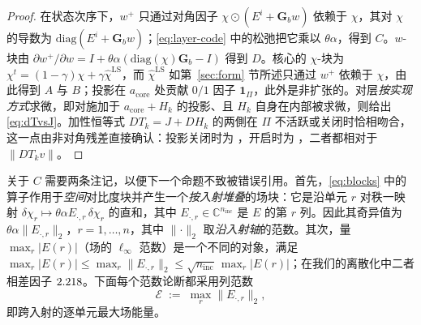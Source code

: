 \documentclass[UTF8,a4paper,11pt]{ctexart}
\newcommand{\C}{\mathbb{C}}
\newcommand{\norm}[1]{\lVert #1 \rVert}
\newcommand{\numv}[1]{#1}
\begin{document}
\begin{proof}
在状态次序下，$w^{+}$ 只通过对角因子
$\chi\odot(E^i+\mathbf{G}_b w)$ 依赖于 $\chi$，其对 $\chi$ 的导数为
$\mathrm{diag}(E^i+\mathbf{G}_b w)$；\eqref{eq:layer-code} 中的松弛把它乘以
$\theta\alpha$，得到 $C$。$w$-块由
$\partial w^{+}/\partial w=I+\theta\alpha(\mathrm{diag}(\chi)\mathbf{G}_b-I)$ 得到 $D$。核心的 $\chi$-块为 $\chi^{t}=(1-\gamma)\chi+\gamma\hat\chi^{\mathrm{LS}}$，而
$\hat\chi^{\mathrm{LS}}$ 如第~\ref{sec:form} 节所述只通过 $w^{+}$ 依赖于 $\chi$，由此得到
$A$ 与 $B$；投影在 $a_{\mathrm{core}}$ 处贡献 $0/1$ 因子 $\mathbf{1}_{\Pi}$，此外是非扩张的。对层\emph{按实现方式}求微，即对施加于 $a_{\mathrm{core}}+H_k$ 的投影、且 $H_k$ 自身在内部被求微，则给出 \eqref{eq:dTvsJ}。加性恒等式 $DT_k=J+DH_k$ 的两側在 $\Pi$ 不活跃或关闭时恰相吻合，这一点由非对角残差直接确认：投影关闭时为 \numv{\NumTOneRelOff}，开启时为 \numv{\NumTOneRelOn}，二者都相对于 $\norm{DT_kv}$。
\end{proof}
关于 $C$ 需要两条注记，以便下一个命题不致被错误引用。首先，\eqref{eq:blocks} 中的算子作用于\emph{空间}对比度块并产生一个\emph{按入射堆叠}的场块：它是沿单元 $r$ 对秩一映射 $\delta\chi_r\mapsto\theta\alpha E_{\cdot,r}\,\delta\chi_r$ 的直和，其中 $E_{\cdot,r}\in\C^{n_{\mathrm{inc}}}$ 是 $E$ 的第 $r$ 列。因此其奇异值为
$\theta\alpha\norm{E_{\cdot,r}}_2$，$r=1,\dots,n$，其中 $\norm{\cdot}_2$ 取\emph{沿入射轴}的范数。其次，量 $\max_r|E(r)|$（场的 $\ell_\infty$ 范数）是一个不同的对象，满足
$\max_r|E(r)|\le\max_r\norm{E_{\cdot,r}}_2\le\sqrt{n_{\mathrm{inc}}}\,\max_r|E(r)|$；在我们的离散化中二者相差因子 $\numv{\NumEInfRatio}$。下面每个范数论断都采用列范数
\begin{equation}\label{eq:Ecol}
\mathcal{E}\;:=\;\max_{r}\norm{E_{\cdot,r}}_2 ,
\end{equation}
即跨入射的逐单元最大场能量。
\end{document}

